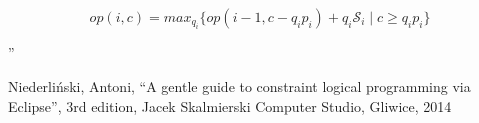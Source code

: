 \documentclass{article}
\begin{document}
\[
  op(i,c) =
    max_{q_i}\{op(i-1, c-q_i p_i) + q_i \mathscr{S}_i\; |\; c \geq q_i p_i\}
\]


''


  \begin{thebibliography}{2}

    Niederliński, Antoni,
    ``A gentle guide to constraint logical programming via Eclipse'',
    3rd edition, Jacek Skalmierski Computer Studio, Gliwice, 2014



  \end{thebibliography}
\end{document}
